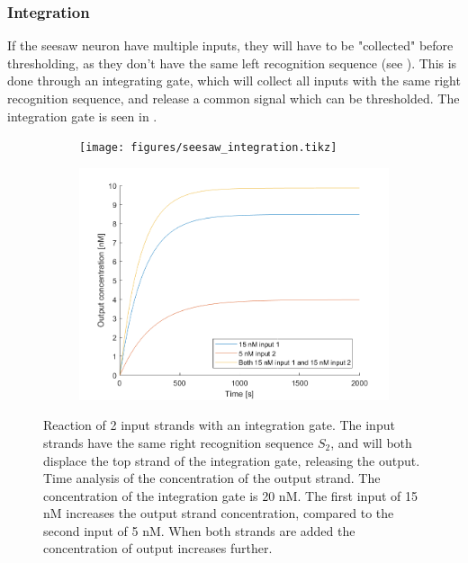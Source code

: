 \subsubsection{Integration}
If the seesaw neuron have multiple inputs, they will have to be "collected" before thresholding, as they don't have the same left recognition sequence (see ). This is done through an integrating gate, which will collect all inputs with the same right recognition sequence, and release a common signal which can be thresholded. The integration gate is seen in .

\begin{figure}[h]
\begin{subfigure}[t]{.49\textwidth}
  \texttt{[image: figures/seesaw\_integration.tikz]}
  \caption{}
  \label{seesaw_integration_reaction}
\end{subfigure}
\hfill
\begin{subfigure}[t]{.49\columnwidth}
  \includegraphics[width=\linewidth]{images/integration.png}
  \caption{}
  \label{seesaw_integration_time}
\end{subfigure}
\caption{ Reaction of 2 input strands with an integration gate. The input strands have the same right recognition sequence $S_2$, and will both displace the top strand of the integration gate, releasing the output.  Time analysis of the concentration of the output strand. The concentration of the integration gate is 20 nM. The first input of 15 nM increases the output strand concentration, compared to the second input of 5 nM. When both strands are added the concentration of output increases further.}
\label{seesaw_integration}
\end{figure}

